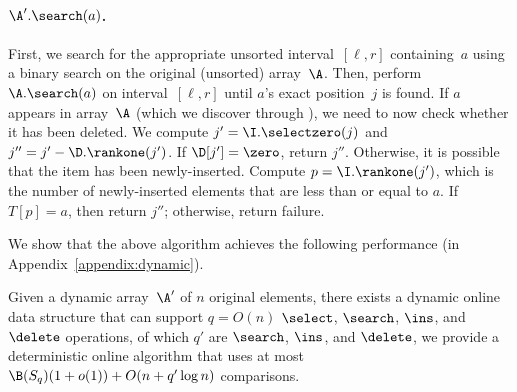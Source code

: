 \paragraph{$\A'.\search(a)$.} First, we search for the appropriate 
unsorted interval~$[\ell,r]$ containing~$a$ using a binary search 
on the original (unsorted) array~$\A$. Then, perform $\A.\search(a)$ 
on interval~$[\ell,r]$ until $a$'s exact position~$j$ is found. If $a$ 
appears in array~$\A$ (which we discover through \search), we 
need to now check whether it has been deleted. We compute 
$j' = \I.\selectzero(j)$ and $j'' = j' - \D.\rankone(j')$. If $\D[j'] = \zero$, 
return $j''$. Otherwise, it is possible that the item has been 
newly-inserted. Compute $p=\I.\rankone(j')$, which is the number of 
newly-inserted elements that are less than or equal to $a$. 
If $T[p]=a$, then return $j''$; otherwise, return failure.



We show that the above algorithm achieves the following performance 
(in Appendix~\ref{appendix:dynamic}).

\begin{theorem}
\label{thm:dynamic-internal}
Given a dynamic array~$\A'$ of $n$ original elements, there exists a dynamic online data structure that can support $q = O(n)$ $\select$, $\search$, $\ins$, and $\delete$ operations, of which $q'$ are $\search$, $\ins$, and $\delete$, we provide a deterministic online algorithm that uses at most $\B(S_q) (1 + o(1)) + O(n + q' \log n)$ comparisons.
\end{theorem}

